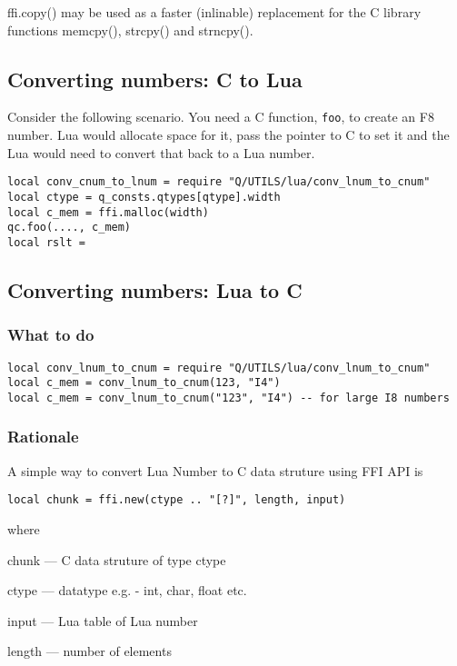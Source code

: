 \be
\item 
ffi.copy() may be used as a faster (inlinable) replacement
 for the C library functions memcpy(), strcpy() and strncpy().
\ee

\subsection{Converting numbers: C to Lua}
\label{cnum_to_lnum}

Consider the following scenario. 
You need a C function, {\tt foo}, to create an F8 number.
Lua would allocate space for it, pass the pointer to C to set it and the Lua
would need to convert that back to a Lua number.
\begin{verbatim}
local conv_cnum_to_lnum = require "Q/UTILS/lua/conv_lnum_to_cnum"
local ctype = q_consts.qtypes[qtype].width
local c_mem = ffi.malloc(width)
qc.foo(...., c_mem)
local rslt = 
\end{verbatim}

\subsection{Converting numbers: Lua to C}
\label{lnum_to_cnum}

\subsubsection{What to do}

\begin{verbatim}
local conv_lnum_to_cnum = require "Q/UTILS/lua/conv_lnum_to_cnum"
local c_mem = conv_lnum_to_cnum(123, "I4")
local c_mem = conv_lnum_to_cnum("123", "I4") -- for large I8 numbers
\end{verbatim}

\subsubsection{Rationale}
A simple way to convert Lua Number to C data struture using FFI API is
\begin{verbatim}
local chunk = ffi.new(ctype .. "[?]", length, input)
\end{verbatim}
where
\be
\item 
\item chunk  ---  C data struture of type ctype
\item ctype  ---  datatype e.g. -  int, char, float etc.
\item input  ---  Lua table of Lua number
\item length ---  number of elements
\ee

